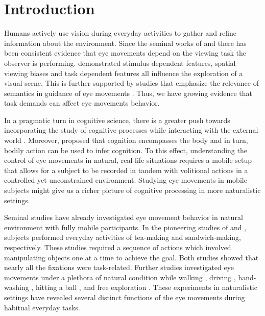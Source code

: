 \section{Introduction}

Humans actively use vision during everyday activities to gather and refine information about the environment. Since the seminal works of \citet{Yarbus2013-eu} and \citet{Buswell1935-di} there has been consistent evidence that eye movements depend on the viewing task the observer is performing.  \citet{Kollmorgen2010-wg} demonstrated stimulus dependent features, spatial viewing biases and task dependent features all influence the exploration of a visual scene. This is further supported by studies that emphasize the relevance of semantics in guidance of eye movements \citep{Henderson2017-it, Einhauser2008-yi}. Thus, we have growing evidence that task demands can affect eye movements behavior.

In a pragmatic turn in cognitive science, there is a greater push towards incorporating the study of cognitive processes while interacting with the external world \citep{Parada2020-qq}. Moreover, \citet{Engel2013-bx} proposed that cognition encompasses the body and in turn, bodily action can be used to infer cognition. To this effect, understanding the control of eye movements in natural, real-life situations requires a mobile setup that allows for a subject to be recorded in tandem with volitional actions in a controlled yet unconstrained environment. Studying eye movements in mobile subjects might give us a richer picture of cognitive processing in more naturalistic settings.

Seminal studies have already investigated eye movement behavior in natural environment with fully mobile participants. In the pioneering studies of \citet{Land1999-ol} and \citet{Hayhoe2003-lw}, subjects performed everyday activities of tea-making and sandwich-making, respectively. These studies required a sequence of actions which involved manipulating objects one at a time to achieve the goal. Both studies showed that nearly all the fixations were task-related. Further studies investigated eye movements under a plethora of natural condition while walking \citep{Matthis2018-ho}, driving \citep{Mars2012-bn, Sullivan2012-gg, Navarro2020-wv}, hand-washing \citep{Pelz2001-cn}, hitting a ball \citep{Land2000-pw}, and free exploration \citep{Schumann2008-un}. These experiments in naturalistic settings have revealed several distinct functions of the eye movements during habitual everyday tasks.

